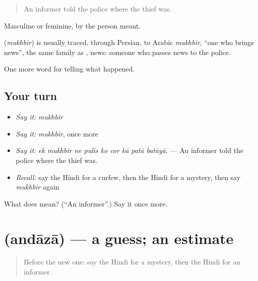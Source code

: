 \begin{quote}
An informer told the police where the thief was.
\end{quote}

Masculine or feminine, by the person meant.

\begin{cousinweb}
\textbf{} (\emph{mukhbir}) is usually traced, through Persian, to Arabic \emph{mukhbir}, \textquotedblleft{}one who brings news\textquotedblright{}, the same family as \textbf{}, news: someone who passes news to the police.
\end{cousinweb}

\begin{grammarlens}[title={What you've built}]
One more word for telling what happened.
\end{grammarlens}

\subsection*{Your turn}
\begin{itemize}
\raggedright
  \item \emph{Say it:} \emph{mukhbir}
  \item \emph{Say it:} \emph{mukhbir}, once more
  \item \emph{Say it:} \emph{ek mukhbir ne pulis ko cor kā patā batāyā.} — An informer told the police where the thief was.
  \item \emph{Recall:} say the Hindi for a curfew, then the Hindi for a mystery, then say \emph{mukhbir} again
\end{itemize}

\begin{tcolorbox}[breakable,colback=teal!4,colframe=teal!35!black,title={Before you move on}]
What does  mean? (\textquotedblleft{}An informer\textquotedblright{}.) Say it once more.
\end{tcolorbox}
\section[\texorpdfstring{\hi{अंदाज़ा} (andāzā)}{अंदाज़ा (andāzā)}]{ (andāzā) — a guess; an estimate}

\label{lesson:HI-C317-andaza}



\begin{quote}
Before the new one: say the Hindi for a mystery, then the Hindi for an informer.
\end{quote}

